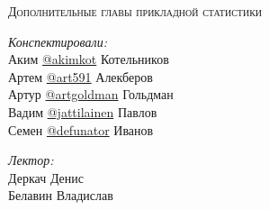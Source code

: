 \begin{titlepage}
\vbox{ }

\vbox{ }

\begin{center}

\textsc{\LARGE Дополнительные главы прикладной статистики}\\[1.5cm]

\vbox{ }
\begin{minipage}{0.4\textwidth}
\begin{flushleft} \large
\emph{Конспектировали:}\\
Аким \href{https://t.me/akimkot}{@akimkot} Котельников \\
Артем \href{https://t.me/art591}{@art591} Алекберов \\
Артур \href{https://t.me/artgoldman}{@artgoldman} Гольдман \\
Вадим \href{https://t.me/jattilainen}{@jattilainen} Павлов \\
Семен \href{https://t.me/defunator}{@defunator} Иванов \\
\end{flushleft}
\end{minipage}
\begin{minipage}{0.4\textwidth}
\begin{flushright} \large
\emph{Лектор:} \\
Деркач Денис \\
Белавин Владислав
\end{flushright}
\end{minipage}
\vfill
\end{center}
\end{titlepage}